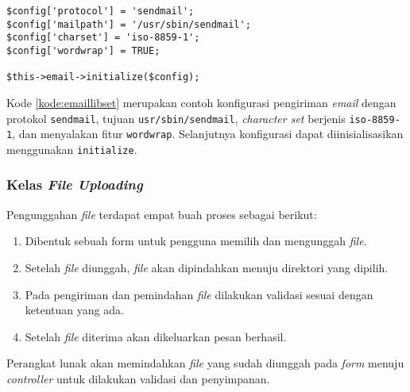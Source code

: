 \begin{lstlisting}[caption=Contoh konfigurasi preferensi \textit{library email} secara manual, label=kode:emaillibset]
$config['protocol'] = 'sendmail';
$config['mailpath'] = '/usr/sbin/sendmail';
$config['charset'] = 'iso-8859-1';
$config['wordwrap'] = TRUE;

$this->email->initialize($config);
\end{lstlisting}
Kode \ref{kode:emaillibset} merupakan contoh konfigurasi pengiriman \textit{email} dengan protokol \texttt{sendmail}, tujuan \texttt{usr/sbin/sendmail}, \textit{character set} berjenis \texttt{iso-8859-1}, dan menyalakan fitur \texttt{wordwrap}. Selanjutnya konfigurasi dapat diinisialisasikan menggunakan \texttt{initialize}.

\subsubsection{Kelas \textit{File Uploading}}
Pengunggahan \textit{file} terdapat empat buah proses sebagai berikut:
\begin{enumerate}
\item Dibentuk sebuah form untuk pengguna memilih dan mengunggah \textit{file}.
\item Setelah \textit{file} diunggah, \textit{file} akan dipindahkan menuju direktori yang dipilih.
\item Pada pengiriman dan pemindahan \textit{file} dilakukan validasi sesuai dengan ketentuan yang ada.
\item Setelah \textit{file} diterima akan dikeluarkan pesan berhasil.
\end{enumerate}

Perangkat lunak akan memindahkan \textit{file} yang sudah diunggah pada \textit{form} menuju \textit{controller} untuk dilakukan validasi dan penyimpanan.

